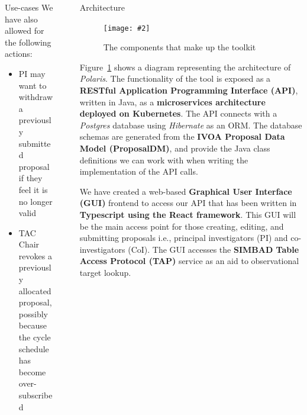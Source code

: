 \documentclass[final]{beamer}
\newlength{\sepwidth}
\newlength{\colwidth}
\newcommand{\separatorcolumn}{\begin{column}{\sepwidth}\end{column}}
\newcommand{\insertFigure}[3][width=1.0\textwidth]{%
    \begin{figure}[ht]
    \centering
    \texttt{[image: \#2]}
    \caption{#3}
    \label{fig:#2}
    \end{figure}
}
\begin{document}
\begin{frame}[t]
\begin{columns}[t]
\begin{column}{\colwidth}
\begin{block}{Use-cases}
                    We have also allowed for the following actions:

                    \begin{itemize}
                        \item PI may want to withdraw a previously submitted proposal if they feel it is no longer valid
                        \item TAC Chair revokes a previously allocated proposal, possibly because the cycle schedule has become over-subscribed
                    \end{itemize}

                \end{block}

            \end{column}

            \separatorcolumn

            \begin{column}{\colwidth}

                \begin{block}{Architecture}

                    \insertFigure[width=28cm,height=35cm]{architecture}{The components that make up the toolkit}

                    Figure~\ref{fig:architecture} shows a diagram representing the architecture of \emph{Polaris}.
                    The functionality of the tool is exposed as a \textbf{RESTful Application Programming Interface (API)},
                    written in Java, as a \textbf{microservices architecture deployed on Kubernetes}.
                    The API connects with a \emph{Postgres} database using \emph{Hibernate} as an ORM\@.
                    The database schemas are generated from the \textbf{IVOA Proposal Data Model (ProposalDM)}, and
                    provide the Java class definitions we can work with when writing the implementation of the API calls.

                    We have created a web-based \textbf{Graphical User Interface (GUI)} frontend to access our API
                    that has been written in \textbf{Typescript using the React framework}.
                    This GUI will be the main access point for those creating, editing, and submitting proposals i.e.,
                    principal investigators (PI) and co-investigators (CoI).
                    The GUI accesses the \textbf{SIMBAD Table Access Protocol (TAP)} service as an aid to observational
                    target lookup.


\end{block}
\end{column}
\end{columns}
\end{frame}
\end{document}

